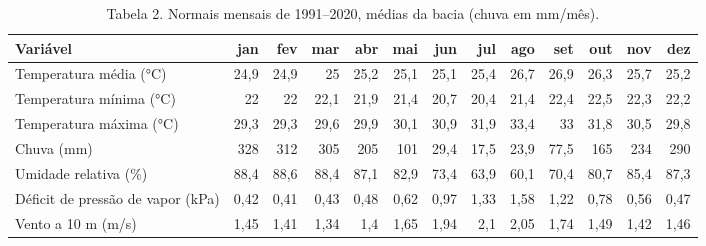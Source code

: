 \begin{table}
\caption{Tabela 2. Normais mensais de 1991–2020, médias da bacia (chuva em mm/mês).}
\label{tab:03_clima:tapajos:normais_mensais}
\begin{tabular}{lrrrrrrrrrrrr}
\toprule
Variável & jan & fev & mar & abr & mai & jun & jul & ago & set & out & nov & dez \\
\midrule
Temperatura média (°C) & 24,9 & 24,9 & 25 & 25,2 & 25,1 & 25,1 & 25,4 & 26,7 & 26,9 & 26,3 & 25,7 & 25,2 \\
Temperatura mínima (°C) & 22 & 22 & 22,1 & 21,9 & 21,4 & 20,7 & 20,4 & 21,4 & 22,4 & 22,5 & 22,3 & 22,2 \\
Temperatura máxima (°C) & 29,3 & 29,3 & 29,6 & 29,9 & 30,1 & 30,9 & 31,9 & 33,4 & 33 & 31,8 & 30,5 & 29,8 \\
Chuva (mm) & 328 & 312 & 305 & 205 & 101 & 29,4 & 17,5 & 23,9 & 77,5 & 165 & 234 & 290 \\
Umidade relativa (\%) & 88,4 & 88,6 & 88,4 & 87,1 & 82,9 & 73,4 & 63,9 & 60,1 & 70,4 & 80,7 & 85,4 & 87,3 \\
Déficit de pressão de vapor (kPa) & 0,42 & 0,41 & 0,43 & 0,48 & 0,62 & 0,97 & 1,33 & 1,58 & 1,22 & 0,78 & 0,56 & 0,47 \\
Vento a 10 m (m/s) & 1,45 & 1,41 & 1,34 & 1,4 & 1,65 & 1,94 & 2,1 & 2,05 & 1,74 & 1,49 & 1,42 & 1,46 \\
\bottomrule
\end{tabular}
\end{table}
